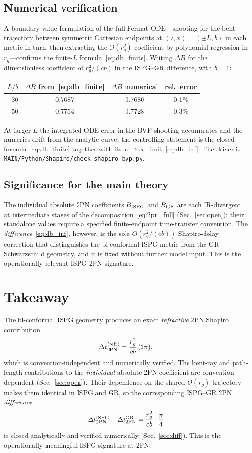 \documentclass[11pt]{article}
\begin{document}
\subsection{Numerical verification}

A boundary-value formulation of the full Fermat ODE---shooting
for the bent trajectory between symmetric Cartesian
endpoints at $(z,x)=(\pm L,b)$ in each metric in turn, then
extracting the $O(r_g^2)$ coefficient by polynomial regression
in $r_g$---confirms the finite-$L$
formula~\eqref{eq:db_finite}.  Writing $\Delta B$ for the
dimensionless coefficient of $r_g^2/(cb)$ in the ISPG--GR
difference, with $b=1$:
\begin{center}
\begin{tabular}{rccc}
\toprule
$L/b$ & $\Delta B$ from~\eqref{eq:db_finite} & $\Delta B$ numerical & rel.\ error \\
\midrule
30 & 0.7687 & 0.7680 & 0.1\% \\
50 & 0.7754 & 0.7728 & 0.3\% \\
\bottomrule
\end{tabular}
\end{center}
At larger $L$ the integrated ODE error in the BVP shooting
accumulates and the numerics drift from the analytic curve;
the controlling statement is the closed
formula~\eqref{eq:db_finite} together with its
$L\to\infty$ limit~\eqref{eq:db_inf}.  The driver is
\texttt{MAIN/Python/Shapiro/check\_shapiro\_bvp.py}.

\subsection{Significance for the main theory}

The individual absolute 2PN coefficients $B_{\rm ISPG}$ and $B_{\rm GR}$
are each IR-divergent at intermediate stages of the
decomposition~\eqref{eq:2pn_full} (Sec.~\ref{sec:open});
their standalone values require a specified finite-endpoint
time-transfer convention.  The
\emph{difference}~\eqref{eq:db_inf}, however, is the sole
$O(r_g^2/(cb))$ Shapiro-delay correction that distinguishes
the bi-conformal ISPG metric from the GR Schwarzschild
geometry, and it is fixed without further model input.
This is the operationally relevant ISPG 2PN signature.

\section*{Takeaway}
The bi-conformal ISPG geometry produces an exact
\emph{refractive} 2PN Shapiro contribution
\[
\Delta t_{2{\rm PN}}^{\rm (refr)}=\frac{r_g^2}{cb}\,(2\pi),
\]
which is convention-independent and numerically verified.
The bent-ray and path-length contributions to the
\emph{individual} absolute 2PN coefficient are convention-dependent
(Sec.~\ref{sec:open}).  Their dependence on the shared $O(r_g)$
trajectory makes them identical in ISPG and GR, so the
corresponding ISPG--GR 2PN \emph{difference}
\[
\Delta t_{2{\rm PN}}^{\rm ISPG}-\Delta t_{2{\rm PN}}^{\rm GR}
=\frac{r_g^2}{cb}\cdot\frac{\pi}{4}
\]
is closed analytically and verified numerically
(Sec.~\ref{sec:diff}).  This is the operationally meaningful
ISPG signature at 2PN.
\end{document}
